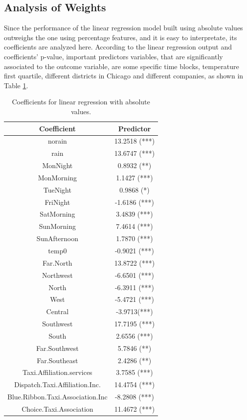 \documentclass[twoside,11pt]{article}
\begin{document}
\subsection{Analysis of Weights}
Since the performance of the linear regression model built using absolute values outweighs the one using percentage features, and it is easy to interpretate, its coefficients are analyzed here. According to the linear regression output and coefficients' p-value, important predictors variables, that are significantly associated to the outcome variable, are some specific time blocks, temperature first quartile, different districts in Chicago and different companies, as shown in Table \ref{tab:coef_ols_abs}.

\begin{table}[h]
    \centering
    \begin{tabular}{c|c}
        Coefficient & Predictor \\ 
        \hline
        norain & 13.2518 (\****) \\
        rain & 13.6747 (***) \\
        MonNight & 0.8932 (**) \\
        MonMorning & 1.1427 (***) \\
        TueNight & 0.9868 (*) \\
        FriNight & -1.6186 (***)\\
        SatMorning & 3.4839 (***) \\
        SunMorning & 7.4614 (***) \\
        SunAfternoon & 1.7870 (***) \\
        temp0 & -0.9021 (***) \\
        Far.North & 13.8722 (***) \\
        Northwest & -6.6501 (***) \\
        North  & -6.3911 (***) \\
        West & -5.4721 (***) \\
        Central & -3.9713(***) \\
        Southwest & 17.7195 (***) \\
        South & 2.6556 (***) \\
        Far.Southwest & 5.7846 (**) \\
        Far.Southeast & 2.4286 (**) \\
        Taxi.Affiliation.services & 3.7585 (***) \\
        Dispatch.Taxi.Affiliation.Inc. & 14.4754 (***) \\
        Blue.Ribbon.Taxi.Association.Inc & -8.2808 (***) \\
        Choice.Taxi.Association & 11.4672 (***) \\
    \end{tabular}
    \caption{Coefficients for linear regression with absolute values.}
    \label{tab:coef_ols_abs}
\end{table}
\end{document}
